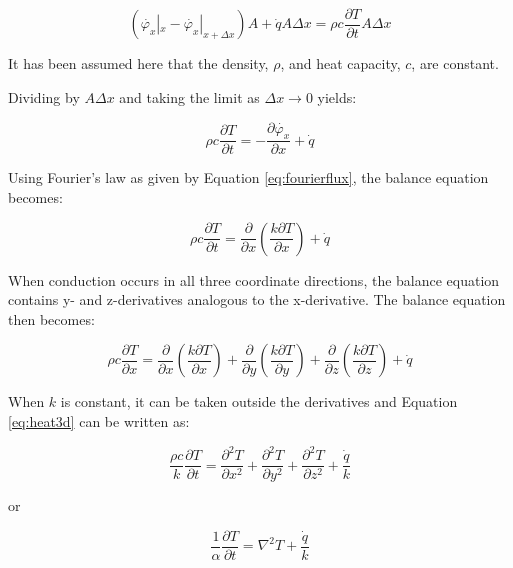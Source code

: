 \begin{equation}
	\label{eq;heatbalance}
	\left( \dot{\varphi_x}|_x - \dot{\varphi_x}|_{x + \Delta x} \right)A + \dot{q}A \Delta x = \rho c  \frac{\partial T}{\partial t}A\Delta x
\end{equation}

It has been assumed here that the density, $\rho$, and heat capacity, $c$, are constant. 

Dividing by $A \Delta x$ and taking the limit as $\Delta x \rightarrow 0 $ yields:

\begin{equation}
	\rho c  \frac{\partial T}{\partial t} = -\frac{\partial \dot{\varphi_x}}{\partial x} + \dot{q}
\end{equation}

Using Fourier’s law as given by Equation \eqref{eq:fourierflux}, the balance equation becomes:

\begin{equation}
	\rho c  \frac{\partial T}{\partial t} = \frac{\partial}{\partial x} \left(\frac{k \partial T}{\partial x} \right)+ \dot{q}
\end{equation}

When conduction occurs in all three coordinate directions, the balance equation contains y- and
z-derivatives analogous to the x-derivative. The balance equation then becomes:

\begin{equation}
	\label{eq:heat3d}
	\rho c  \frac{\partial T}{\partial x} = \frac{\partial}{\partial x} \left(\frac{k \partial T}{\partial x} \right)  + \frac{\partial}{\partial y} \left(\frac{k \partial T}{\partial y} \right) + \frac{\partial}{\partial z} \left(\frac{k \partial T}{\partial z} \right) + \dot{q}
\end{equation}

When $k$ is constant, it can be taken outside the derivatives and Equation \eqref{eq:heat3d} can be written as:	

\begin{equation}
	\frac{\rho c}{k}  \frac{\partial T}{\partial t} = \frac{\partial^2 T}{\partial x^2}  + \frac{\partial^2 T}{\partial y^2} + \frac{\partial^2 T}{\partial z^2} + \frac{\dot{q}}{k}
\end{equation}

or

\begin{equation}
	\frac{1}{\alpha} \frac{\partial T}{\partial t} = \nabla^2 T + \frac{\dot{q}}{k}
\end{equation}

